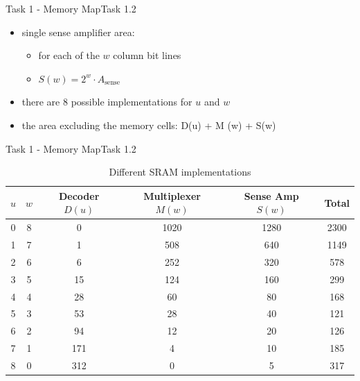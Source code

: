 {\begin{frame}[allowframebreaks]{Task 1 - Memory Map}{Task 1.2\vspace{0.25cm}}
\begin{itemize}
\begin{itemize}
    \end{itemize}
    \item \alert{single sense amplifier area:}
    \begin{itemize}
      \item for each of the $w$ \alert{column bit lines}
      \item $S(w)=2^w \cdot A_{\text {sense}}$
    \end{itemize}
    \item there are $8$ possible \alert{implementations} for $u$ and $w$
    \item the area \alert{excluding} the memory cells: D(u) + M (w) + S(w)
  \end{itemize}
\end{frame}

\begin{frame}{Task 1 - Memory Map}{Task 1.2\vspace{0.25cm}}
  \centering
 \begin{table}
   \begin{tabular}{|c|c||c|c|c|c|}
      \hline$u$ & $w$ & Decoder $D(u)$ & Multiplexer $M(w)$ & Sense Amp $S(w)$ & Total \\
      \hline \hline 0 & 8 & 0 & 1020 & 1280 & 2300 \\
      \hline 1 & 7 & 1 & 508 & 640 & 1149 \\
      \hline 2 & 6 & 6 & 252 & 320 & 578 \\
      \hline 3 & 5 & 15 & 124 & 160 & 299 \\
      \hline 4 & 4 & 28 & 60 & 80 & 168 \\
      \hline 5 & 3 & 53 & 28 & 40 & 121 \\
      \hline 6 & 2 & 94 & 12 & 20 & 126 \\
      \hline 7 & 1 & 171 & 4 & 10 & 185 \\
      \hline 8 & 0 & 312 & 0 & 5 & 317 \\
      \hline
    \end{tabular}
    \caption{Different SRAM implementations}
 \end{table}
\end{frame}
}\fi
